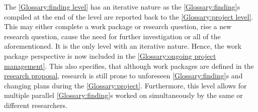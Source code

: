 \documentclass{bausteinefdm}
\begin{document}

The \ref{Glossary:finding level} has an iterative nature as the \ref{Glossary:finding}s compiled at the end of the level are reported back to the \ref{Glossary:project level}.
This may either complete a work package or research question, rise a new research question, cause the need for further investigation or all of the aforementioned.
It is the only level with an iterative nature.
Hence, the work package perspective is now included in the \ref{Glossary:ongoing project management}.
This also specifies, that although work packages are defined in the \hyperref[Glossary:research proposal]{research proposal}, research is still prone to unforeseen \ref{Glossary:finding}s and changing plans during the \ref{Glossary:project}.
Furthermore, this level allows for multiple parallel \ref{Glossary:finding}s worked on simultaneously by the same or different researchers.
\end{document}
